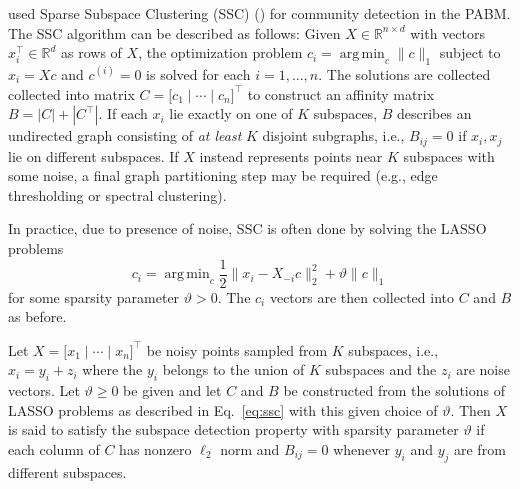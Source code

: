 \documentclass[12pt]{article}
\DeclareMathOperator*{\argmin}{arg\,min}
\begin{document}
\citet{noroozi2019estimation} used Sparse Subspace Clustering (SSC) 
(\cite{5206547}) for community detection in the PABM. 
The SSC algorithm can be described as follows: 
Given \(X \in \mathbb{R}^{n \times d}\) with vectors
\(x_i^\top \in \mathbb{R}^d\) as rows of \(X\), the optimization problem
\(c_i = \argmin_{c} \|c\|_1\) subject to \(x_i = X c\) and
\(c^{(i)} = 0\) is solved for each \(i = 1, ..., n\). The solutions are
collected collected into matrix
\(C = \bigl[ c_1 \mid \cdots \mid c_n \bigr]^\top\) to
construct an affinity matrix \(B = |C| + |C^\top|\). If each \(x_i\) lie
exactly on one of \(K\) subspaces, \(B\) describes an undirected graph
consisting of {\em at least} \(K\) disjoint subgraphs, i.e., \(B_{ij} = 0\) if
\(x_i, x_j\) lie on different subspaces. If \(X\) instead represents
points near \(K\) subspaces with some noise, a final graph partitioning
step may be required (e.g., edge thresholding or spectral clustering).

In practice, due to presence of noise, SSC is often done by solving the LASSO problems
\begin{equation} \label{eq:ssc}
c_i = \argmin_c \frac{1}{2} \|x_i - X_{-i} c\|^2_2 + \vartheta \|c\|_1
\end{equation}
for some sparsity parameter \(\vartheta > 0\). The \(c_i\) vectors are
then collected into \(C\) and \(B\) as before.

\begin{definition}
  \label{def:subspace_detection}
Let $X = \bigl[ x_1 \mid \cdots \mid x_n \bigr]^\top$ be noisy
points sampled from $K$ subspaces, i.e., $x_i = y_i + z_i$ where the
$y_i$ belongs to the union of $K$ subspaces and the $z_i$ are noise
vectors. Let $\vartheta \geq 0$ be given and
let $C$ and $B$ be constructed from the
solutions of LASSO problems as described in Eq.~\eqref{eq:ssc} with
this given choice of $\vartheta$. Then $X$
is said to satisfy the subspace detection property 
with sparsity parameter $\vartheta$ if each column of
$C$ has nonzero $\ell_2$ norm and $B_{ij} = 0$ whenever $y_i$ and $y_j$ are
from different subspaces.
\end{definition}
\end{document}
